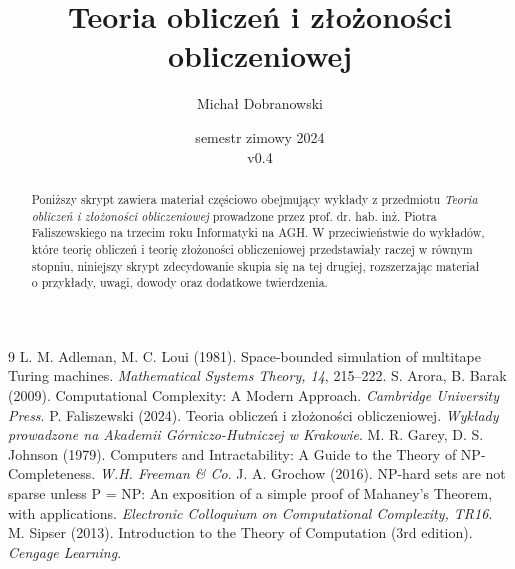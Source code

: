 \documentclass[pretty,polish,bibliography=totocnumbered]{angav}
\title{Teoria obliczeń i złożoności obliczeniowej}
\author{Michał Dobranowski}
\date{semestr zimowy 2024 \\ v0.4}
\begin{document}
    \maketitle
    \begin{abstract}
        \noindent Poniższy skrypt zawiera materiał częściowo obejmujący wykłady z przedmiotu \textit{Teoria obliczeń i złożoności obliczeniowej} prowadzone przez prof. dr. hab. inż. Piotra Faliszewskiego na trzecim roku Informatyki na AGH\@. W przeciwieństwie do wykładów, które teorię obliczeń i teorię złożoności obliczeniowej przedstawiały raczej w równym stopniu, niniejszy skrypt zdecydowanie skupia się na tej drugiej, rozszerzając materiał o przykłady, uwagi, dowody oraz dodatkowe twierdzenia.
    \end{abstract}
    \vspace*{\fill}
    {\footnotesize\doclicenseThis}
    \newpage

    \tableofcontents
    \newpage

    \SetVertexStyle[FillColor=gray, FillOpacity=0.4]
    \SetEdgeStyle[Color=black, LineWidth=0.8pt]

    
    
    

    \begin{thebibliography}{9}
         L. M. Adleman, M. C. Loui (1981). Space-bounded simulation of multitape Turing machines. \textit{Mathematical Systems Theory, 14}, 215--222.
         S. Arora, B. Barak (2009). Computational Complexity: A Modern Approach. \textit{Cambridge University Press}.
         P. Faliszewski (2024). Teoria obliczeń i złożoności obliczeniowej. \textit{Wykłady prowadzone na Akademii Górniczo-Hutniczej w Krakowie}.
         M. R. Garey, D. S. Johnson (1979). Computers and Intractability: A Guide to the Theory of NP-Completeness. \textit{W.H. Freeman \& Co}.
         J. A. Grochow (2016). NP-hard sets are not sparse unless P = NP: An exposition of a simple proof of Mahaney's Theorem, with applications. \textit{Electronic Colloquium on Computational Complexity, TR16}.
         M. Sipser (2013). Introduction to the Theory of Computation (3rd edition). \textit{Cengage Learning}.
    \end{thebibliography}
\end{document}

